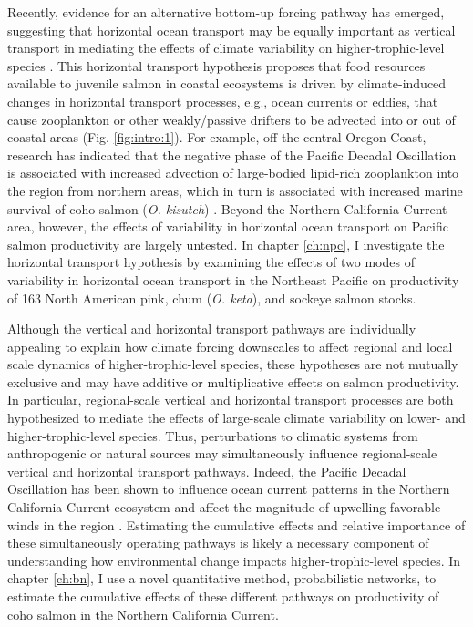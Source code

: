 Recently, evidence for an alternative bottom-up forcing pathway has emerged,
suggesting that horizontal ocean transport may be equally important as vertical
transport in mediating the effects of climate variability on
higher-trophic-level species \citep{DiLorenzo2013b}. This horizontal transport
hypothesis proposes that food resources available to juvenile salmon in coastal
ecosystems is driven by climate-induced changes in horizontal transport
processes, e.g., ocean currents or eddies, that cause zooplankton or other
weakly/passive drifters to be advected into or out of coastal areas (Fig.
\ref{fig:intro:1}). For example, off the central Oregon Coast, research has
indicated that the negative phase of the Pacific Decadal Oscillation is
associated with increased advection of large-bodied lipid-rich zooplankton into
the region from northern areas, which in turn is associated with increased
marine survival of coho salmon (\emph{O. kisutch}) \citep{Keister2011a,
Bi2011a}. Beyond the Northern California Current area, however, the effects of
variability in horizontal ocean transport on Pacific salmon productivity are
largely untested. In chapter \ref{ch:npc}, I investigate the horizontal
transport hypothesis by examining the effects of two modes of variability in
horizontal ocean transport in the Northeast Pacific on productivity of 163 North
American pink, chum (\emph{O. keta}), and sockeye salmon stocks.

Although the vertical and horizontal transport pathways are individually
appealing to explain how climate forcing downscales to affect regional and local
scale dynamics of higher-trophic-level species, these hypotheses are not
mutually exclusive and may have additive or multiplicative effects on salmon
productivity. In particular, regional-scale vertical and horizontal transport
processes are both hypothesized to mediate the effects of large-scale climate
variability on lower- and higher-trophic-level species. Thus, perturbations to
climatic systems from anthropogenic or natural sources may simultaneously
influence regional-scale vertical and horizontal transport pathways. Indeed, the
Pacific Decadal Oscillation has been shown to influence ocean current patterns
in the Northern California Current ecosystem and affect the magnitude of
upwelling-favorable winds in the region \citep{Keister2011a, Chhak2007}.
Estimating the cumulative effects and relative importance of these
simultaneously operating pathways is likely a necessary component of
understanding how environmental change impacts higher-trophic-level species. In
chapter \ref{ch:bn}, I use a novel quantitative method, probabilistic
networks, to estimate the cumulative effects of these different pathways on
productivity of coho salmon in the Northern California Current.


